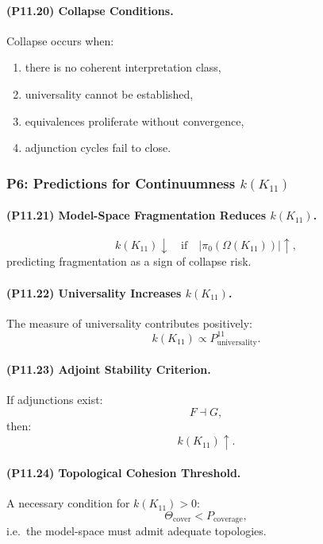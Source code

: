 \paragraph{(P11.20) Collapse Conditions.}
Collapse occurs when:
\begin{enumerate}
    \item there is no coherent interpretation class,
    \item universality cannot be established,
    \item equivalences proliferate without convergence,
    \item adjunction cycles fail to close.
\end{enumerate}

\subsubsection{P6: Predictions for Continuumness $k(K_{11})$}

\paragraph{(P11.21) Model-Space Fragmentation Reduces $k(K_{11})$.}
\[
k(K_{11}) \downarrow \quad\text{if}\quad
|\pi_0(\Omega(K_{11}))| \uparrow,
\]
predicting fragmentation as a sign of collapse risk.

\paragraph{(P11.22) Universality Increases $k(K_{11})$.}
The measure of universality contributes positively:
\[
k(K_{11}) \propto 
P_{\mathrm{universality}}^{11}.
\]

\paragraph{(P11.23) Adjoint Stability Criterion.}
If adjunctions exist:
\[
F \dashv G,
\]
then:
\[
k(K_{11}) \uparrow.
\]

\paragraph{(P11.24) Topological Cohesion Threshold.}
A necessary condition for $k(K_{11}) > 0$:
\[
\Theta_{\mathrm{cover}} < P_{\mathrm{coverage}},
\]
i.e.\ the model-space must admit adequate topologies.

